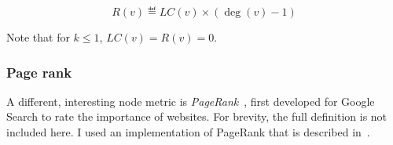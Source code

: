\begin{definition}[Redundancy]
    \[ R(v) \eqdef LC (v) \times (\deg(v) - 1) \]

    Note that for $k \leq 1$, $LC(v) = R(v) = 0$.
\end{definition}

\subsubsection{Page rank}

A different, interesting node metric is \textsl{PageRank}~\cite{BrinAnatomyLargescaleHypertextual1998}, first developed for Google Search to rate the importance of websites.
For brevity, the full definition is not included here.
I used an implementation of PageRank that is described in~\cite{ilprints422}.


%
%
%

%
%
%
%

